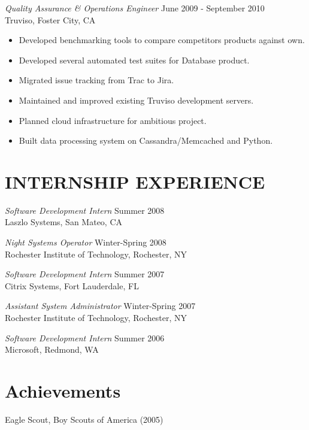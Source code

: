 \documentclass[line,margin]{res}
\begin{document}
\begin{resume}
                {\sl Quality Assurance \& Operations Engineer} \hfill June 2009 - September 2010 \\
                Truviso, Foster City, CA
                \begin{itemize}  \itemsep -2pt %
                 \item Developed benchmarking tools to compare competitors products against own.
                 \item Developed several automated test suites for Database product.
                 \item Migrated issue tracking from Trac to Jira.
                 \item Maintained and improved existing Truviso development servers.
                 \item Planned cloud infrastructure for ambitious project.
                 \item Built data processing system on Cassandra/Memcached and Python.
                \end{itemize}
                
\section{INTERNSHIP EXPERIENCE}
                
                {\sl Software Development Intern} \hfill        Summer 2008 \\
                Laszlo Systems, San Mateo, CA
                
                {\sl Night Systems Operator} \hfill        Winter-Spring 2008 \\
                Rochester Institute of Technology, Rochester, NY
                
                {\sl Software Development Intern} \hfill        Summer 2007 \\
                Citrix Systems, Fort Lauderdale, FL
                
                {\sl Assistant System Administrator} \hfill        Winter-Spring 2007 \\
                Rochester Institute of Technology,  Rochester, NY
                
                {\sl Software Development Intern} \hfill          Summer 2006 \\
                Microsoft, Redmond, WA
           
\section{Achievements}             
            Eagle Scout, Boy Scouts of America (2005) \\
 
\end{resume}
\end{document}
